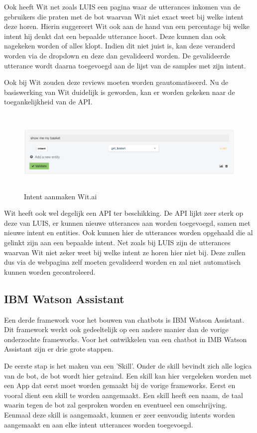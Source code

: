Ook heeft Wit net zoals LUIS een pagina waar de utterances inkomen van de gebruikers die praten met de bot waarvan Wit niet exact weet bij welke intent deze horen. Hierin suggereert Wit ook aan de hand van een percentage bij welke intent hij denkt dat een bepaalde utterance hoort. Deze kunnen dan ook nagekeken worden of alles klopt. Indien dit niet juist is, kan deze veranderd worden via de dropdown en deze dan gevalideerd worden. De gevalideerde utterance wordt daarna toegevoegd aan de lijst van de samples met zijn intent.

Ook bij Wit zouden deze reviews moeten worden geautomatiseerd. Nu de basiswerking van Wit duidelijk is geworden, kan er worden gekeken naar de toegankelijkheid van de API. 

\begin{figure}[h!]
	\centering
	\includegraphics[height=4cm]{img/inbox.png}
	\caption{Intent aanmaken Wit.ai}
	\label{fig:inbox}
\end{figure}

Wit heeft ook wel degelijk een API ter beschikking. De API lijkt zeer sterk op deze van LUIS, er kunnen nieuwe utterances aan worden toegevoegd, samen met nieuwe intent en entities. Ook kunnen hier de utterances worden opgehaald die al gelinkt zijn aan een bepaalde intent. Net zoals bij LUIS zijn de utterances waarvan Wit niet zeker weet bij welke intent ze horen hier niet bij. Deze zullen dus via de webpagina zelf moeten gevalideerd worden en zal niet automatisch kunnen worden gecontroleerd.

\subsection{IBM Watson Assistant}
\label{watson}

Een derde framework voor het bouwen van chatbots is IBM Watson Assistant. Dit framework werkt ook gedeeltelijk op een andere manier dan de vorige onderzochte frameworks. Voor het ontwikkelen van een chatbot in IMB Watson Assistant zijn er drie grote stappen.

De eerste stap is het maken van een 'Skill'. Onder de skill bevindt zich alle logica van de bot, de bot wordt hier getraind. Een skill kan hier vergeleken worden met een App dat eerst moet worden gemaakt bij de vorige frameworks. Eerst en vooral dient een skill te worden aangemaakt. Een skill heeft een naam, de taal waarin tegen de bot zal gesproken worden en eventueel een omschrijving. Eenmaal deze skill is aangemaakt, kunnen er zeer eenvoudig intents worden aangemaakt en aan elke intent utterances worden toegevoegd.

